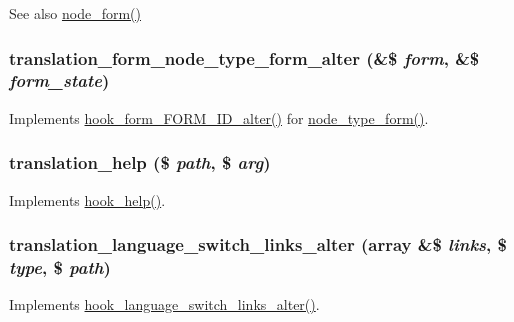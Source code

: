 \begin{DoxySeeAlso}{See also}
\hyperlink{group__forms_ga267299500e205db099ee4e8396769d3f}{node\_\-form()} 
\end{DoxySeeAlso}
\hypertarget{translation_8module_a80c98d8d21852c466102ce1516de426c}{
\subsubsection[{translation\_\-form\_\-node\_\-type\_\-form\_\-alter}]{\setlength{\rightskip}{0pt plus 5cm}translation\_\-form\_\-node\_\-type\_\-form\_\-alter (\&\$ {\em form}, \/  \&\$ {\em form\_\-state})}}
\label{translation_8module_a80c98d8d21852c466102ce1516de426c}
Implements \hyperlink{group__hooks_ga8d4a4089551493d55911bd5c4f218264}{hook\_\-form\_\-FORM\_\-ID\_\-alter()} for \hyperlink{group__forms_ga488f2cb519f924aa0bd9579d9bb0db49}{node\_\-type\_\-form()}. \hypertarget{translation_8module_a37e15a4a5e6c4c30c73d066e80134e08}{
\subsubsection[{translation\_\-help}]{\setlength{\rightskip}{0pt plus 5cm}translation\_\-help (\$ {\em path}, \/  \$ {\em arg})}}
\label{translation_8module_a37e15a4a5e6c4c30c73d066e80134e08}
Implements \hyperlink{group__hooks_ga5589c2714a782738e8851c4c90231f0e}{hook\_\-help()}. \hypertarget{translation_8module_a8f1070c7d30772f67e0200555e94c53a}{
\subsubsection[{translation\_\-language\_\-switch\_\-links\_\-alter}]{\setlength{\rightskip}{0pt plus 5cm}translation\_\-language\_\-switch\_\-links\_\-alter (array \&\$ {\em links}, \/  \$ {\em type}, \/  \$ {\em path})}}
\label{translation_8module_a8f1070c7d30772f67e0200555e94c53a}
Implements \hyperlink{group__hooks_ga77186f4d805f77a8edc3bd8dd6041339}{hook\_\-language\_\-switch\_\-links\_\-alter()}.

